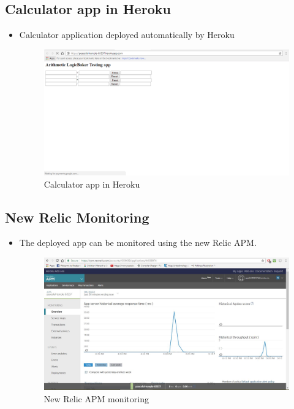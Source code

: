 \documentclass[12pt,a4paper,oneside]{report}
\begin{document}
{\subsection{Calculator app in Heroku}
\begin{itemize}
\item \par Calculator application deployed automatically by Heroku
\begin{figure}[h]
\begin{center}
\includegraphics[scale=.47]{app1.png}
\caption{Calculator app in Heroku}
\label{Calculator app in Heroku}
\end{center}
\end{figure}
\end{itemize}
\newpage
\subsection{New Relic Monitoring}
\begin{itemize}
\item \par The deployed app can be monitored using the new Relic APM.
\begin{figure}[h]
\begin{center}
\includegraphics[scale=.47]{newrelic.png}
\caption{New Relic APM monitoring}
\label{New Relic APM monitoring}
\end{center}
\end{figure}
\end{itemize}
\newpage
}
\end{document}
